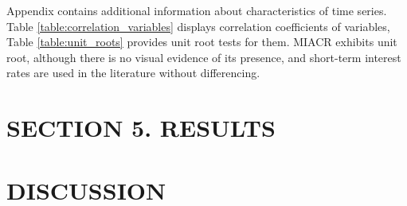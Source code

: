\documentclass[12pt, a4paper]{extarticle}
\begin{document}
Appendix contains additional information about characteristics of time series. Table \ref{table:correlation_variables} displays correlation coefficients of variables, Table \ref{table:unit_roots} provides unit root tests for them. MIACR exhibits unit root, although there is no visual evidence of its presence, and short-term interest rates are used in the literature without differencing.

\clearpage
\section*{SECTION 5. RESULTS}
\setcounter{section}{4}
\setcounter{subsection}{0}


\clearpage
\section*{DISCUSSION}


\renewcommand*{\newblockpunct}{\addperiod\space\bibsentence}
\newpage
\linespread{1.3}

\printbibliography
{}
\newpage
\setcounter{figure}{0}
\setcounter{table}{0}
\makeatletter
\renewcommand*{\thetable}{\alph{table}}
\renewcommand*{\thefigure}{\alph{figure}}
\let\c@table\c@figure
\makeatother 

\end{document}
